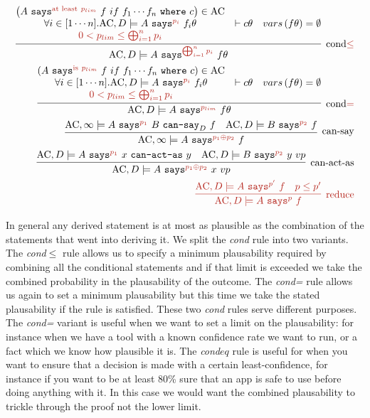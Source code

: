 \documentclass[a4paper]{article}
\newcommand{\new}[1]{{\color{BrickRed} #1}}
\newcommand{\ac}[0]{\ensuremath\text{AC}}
\newcommand{\secpalmath}[1]{\ensuremath\texttt{#1}}
\newcommand{\says}[1]{\secpalmath{says}^{\new{#1}}}
\newcommand{\canSay}[1]{\secpalmath{can-say}_{#1}}
\newcommand{\canActAs}[0]{\secpalmath{can-act-as}}
\newcommand{\where}[0]{\secpalmath{where}}
\begin{document}
{\footnotesize\centering
\begin{eqnarray}
  \infer[\text{cond\new{$\leq$}}]{
    \ac, D \models A~\says{\bigoplus_{i=1}^n p_i}~f\theta
  }{
    \begin{matrix}{
      \left(A~\says{\text{at least}~p_{lim}}~f~if~f_1\cdots f_n~\where~c\right) \in \ac
    }\\{
      \forall i \in [1\cdots n]. \ac, D \models A~\says{p_i}~f_i\theta
    }\\\new{
      0 < p_{lim} \leq \bigoplus_{i=1}^n p_i
    }
    \end{matrix}&
    \vdash c\theta &
    vars\left(f\theta\right) = \emptyset
  }
  \\
  \infer[\text{cond\new{=}}]{
    \ac, D \models A~\says{p_{lim}}~f\theta
  }{
    \begin{matrix}{
      \left(A~\says{\text{is}~p_{lim}}~f~if~f_1\cdots f_n~\where~c\right) \in \ac
    }\\{
      \forall i \in [1\cdots n]. \ac, D \models A~\says{p_i}~f_i\theta
    }\\\new{
      0 < p_{lim} \leq \bigoplus_{i=1}^n p_i
    }
    \end{matrix}&
    \vdash c\theta &
    vars\left(f\theta\right) = \emptyset
  }
  \\
  \infer[\text{can-say}]{
    \ac, \infty \models A~\says{p_1 \oplus p_2}~f
  }{
    \ac, \infty \models A~\says{p_1}~B~\canSay{D}~f &
    \ac, D \models B~\says{p_2}~f
  }
  \\
  \infer[\text{can-act-as}]{
    \ac, D \models A~\says{p_1 \oplus p_2}~x~vp
  }{
    \ac, D \models A~\says{p_1}~x~\canActAs~y &
    \ac, D \models B~\says{p_2}~y~vp
  }
  \\
  \new{
    \infer[\text{reduce}]{
        \ac, D \models A~\says{p}~f
    }{
        \ac, D \models A~\says{p^\prime}~f & p \leq p^\prime
    }
  }
\end{eqnarray}
}

In general any derived statement is at most as plausible as the combination of the statements that went into deriving it.  We split the \emph{cond} rule into two variants.  The \emph{cond$\leq$} rule allows us to specify a minimum plausability required by combining all the conditional statements and if that limit is exceeded we take the combined probability in the plausability of the outcome.
The \emph{cond=} rule allows us again to set a minimum plausability but this time we take the stated plausability if the rule is satisfied.  These two \emph{cond} rules serve different purposes.  The \emph{cond=} variant is useful when we want to set a limit on the plausability: for instance when we have a tool with a known confidence rate we want to run, or a fact which we know how plausible it is.  The \emph{cond$eq$} rule is useful for when you want to ensure that a decision is made with a certain least-confidence, for instance if you want to be at least 80\% sure that an app is safe to use before doing anything with it.  In this case we would want the combined plausability to trickle through the proof not the lower limit.
\end{document}
